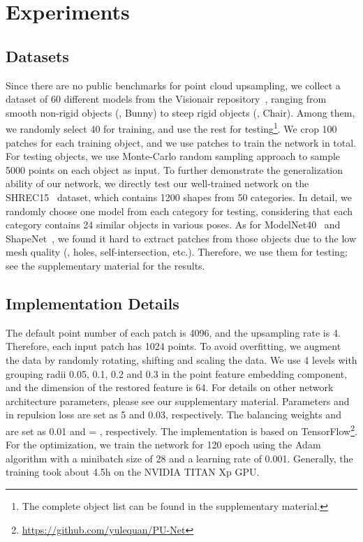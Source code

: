 \section{Experiments}
\label{sec:experiments}

\subsection{Datasets}
Since there are no public benchmarks for point cloud upsampling, we collect a dataset of 60 different models from the Visionair repository~\cite{timmurphy.org}, ranging from smooth non-rigid objects (\eg, Bunny) to steep rigid objects (\eg, Chair).
Among them, we randomly select 40 for training, and use the rest for testing\footnote{The complete object list can be found in the supplementary material.}.
We crop 100 patches for each training object, and we use  patches to train the network in total.
For testing objects, we use Monte-Carlo random sampling approach to sample 5000 points on each object as input.
To further demonstrate the generalization ability of our network, we directly test our well-trained network on the SHREC15~\cite{Lian2015} dataset, which contains 1200 shapes from 50 categories.
In detail, we randomly choose one model from each category for testing, considering that each category contains 24 similar objects in various poses. 
As for ModelNet40~\cite{wu20153d} and ShapeNet~\cite{chang2015shapenet}, we found it hard to extract patches from those objects due to the low mesh quality (\eg, holes, self-intersection, etc.).
Therefore, we use them for testing; see the supplementary material for the results.

\subsection{Implementation Details}
\label{sec:implementationdetails}
The default point number  of each patch is 4096, and the upsampling rate  is 4. Therefore, each input patch has 1024 points.
To avoid overfitting, we augment the data by randomly rotating, shifting and scaling the data.
We use 4 levels with grouping radii 0.05, 0.1, 0.2 and 0.3 in the point feature embedding component, and the dimension  of the restored feature is 64.  For details on other network architecture parameters, please see our supplementary material. 
Parameters  and  in repulsion loss are set as 5 and 0.03, respectively.
The balancing weights  and  are set as 0.01 and  = , respectively.
The implementation is based on TensorFlow\footnote{ \url{https://github.com/yulequan/PU-Net}}.
For the optimization, we train the network for 120 epoch using the Adam~\cite{kingma2014adam} algorithm with a minibatch size of 28 and a learning rate of 0.001.
Generally, the training took about 4.5h on the NVIDIA TITAN Xp GPU. 

